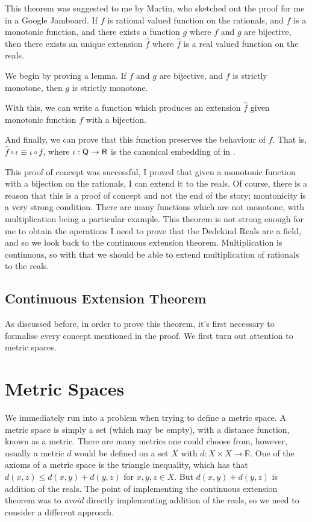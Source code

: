 \documentclass[ProjectReport]{subfiles}
\begin{document}
This theorem was suggested to me by Martin, who sketched out the proof for me in a Google Jamboard. If $f$ is rational valued function on the rationals, and $f$ is a monotonic function, and there exists a function $g$ where $f$ and $g$ are bijective, then there exists an unique extension $\hat{f}$ where $\hat{f}$ is a real valued function on the reals.

We begin by proving a lemma. If $f$ and $g$ are bijective, and $f$ is strictly monotone, then $g$ is strictly monotone.


With this, we can write a function which produces an extension $\hat{f}$ given monotonic function $f$ with a bijection. 


And finally, we can prove that this function preserves the behaviour of $f$. That is, $\hat{f} \circ \iota \equiv \iota \circ f$, where $\iota : \AgdaFunction{Q} \to \AgdaFunction{R}$ is the canonical embedding of  in .


This proof of concept was successful, I proved that given a monotonic function with a bijection on the rationals, I can extend it to the reals. Of course, there is a reason that this is a proof of concept and not the end of the story; montonicity is a very strong condition. There are many functions which are not monotone, with multiplication being a particular example. This theorem is not strong enough for me to obtain the operations I need to prove that the Dedekind Reals are a field, and so we look back to the continuous extension theorem. Multiplication is continuous, so with that we should be able to extend multiplication of rationals to the reals.

\subsection{Continuous Extension Theorem}

As discussed before, in order to prove this theorem, it's first necessary to formalise every concept mentioned in the proof. We first turn out attention to metric spaces.

\section{Metric Spaces}

We immediately run into a problem when trying to define a metric space. A metric space is simply a set (which may be empty), with a distance function, known as a metric. There are many metrics one could choose from, however, usually a metric $d$ would be defined on a set $X$ with $d : X \times X \to \mathbb{R}$. One of the axioms of a metric space is the triangle inequality, which has that $d(x , z) \leq d(x,y) + d(y,z)$ for $x , y , z \in X$. But $d(x,y) + d(y,z)$ is addition of the reals. The point of implementing the continuous extension theorem was to \textit{avoid} directly implementing addition of the reals, so we need to consider a different approach.
\end{document}
